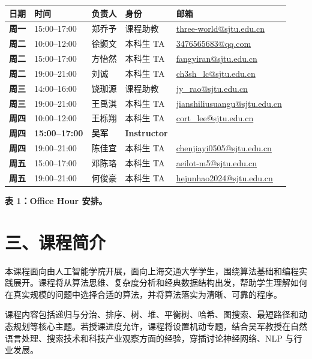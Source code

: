 \documentclass[11pt,a4paper,fontset=none]{ctexart}
\newcommand{\keypoint}[1]{\textbf{\textcolor{emphred}{#1}}}
\newcommand{\captiontext}[1]{\begin{center}{\small \keypoint{#1}}\end{center}}
\begin{document}
\begingroup
\small
\renewcommand{\arraystretch}{1.25}
\setlength{\tabcolsep}{5pt}
\noindent\begin{tabularx}{\textwidth}{@{}>{\bfseries}p{1.0cm}p{2.25cm}p{1.8cm}p{1.8cm}X@{}}
\toprule
\keypoint{日期} & \keypoint{时间} & \keypoint{负责人} & \keypoint{身份} & \keypoint{邮箱} \\
\midrule
周一 & 15:00--17:00 & 郑乔予 & 课程助教 & \href{mailto:three-world@sjtu.edu.cn}{three-world@sjtu.edu.cn} \\
周二 & 10:00--12:00 & 徐颢文 & 本科生 TA & \href{mailto:3476565683@qq.com}{3476565683@qq.com} \\
周二 & 15:00--17:00 & 方怡然 & 本科生 TA & \href{mailto:fangyiran@sjtu.edu.cn}{fangyiran@sjtu.edu.cn} \\
周二 & 19:00--21:00 & 刘诚 & 本科生 TA & \href{mailto:ch3sh_lc@sjtu.edu.cn}{ch3sh\_lc@sjtu.edu.cn} \\
周三 & 14:00--16:00 & 饶珈源 & 课程助教 & \href{mailto:jy_rao@sjtu.edu.cn}{jy\_rao@sjtu.edu.cn} \\
周三 & 19:00--21:00 & 王禹淇 & 本科生 TA & \href{mailto:jianshiliusuangu@sjtu.edu.cn}{jianshiliusuangu@sjtu.edu.cn} \\
周四 & 10:00--12:00 & 王栎翔 & 本科生 TA & \href{mailto:cort_lee@sjtu.edu.cn}{cort\_lee@sjtu.edu.cn} \\
\keypoint{周四} & \keypoint{15:00--17:00} & \keypoint{吴军} & \keypoint{Instructor} & \\
周四 & 19:00--21:00 & 陈佳宜 & 本科生 TA & \href{mailto:chenjiayi0505@sjtu.edu.cn}{chenjiayi0505@sjtu.edu.cn} \\
周五 & 15:00--17:00 & 邓陈珞 & 本科生 TA & \href{mailto:aeilot-m5@sjtu.edu.cn}{aeilot-m5@sjtu.edu.cn} \\
周五 & 19:00--21:00 & 何俊豪 & 本科生 TA & \href{mailto:hejunhao2024@sjtu.edu.cn}{hejunhao2024@sjtu.edu.cn} \\
\bottomrule
\end{tabularx}
\captiontext{表 1：Office Hour 安排。}
\endgroup

\section*{三、课程简介}

本课程面向由人工智能学院开展，面向上海交通大学学生，围绕算法基础和编程实践展开。课程将从算法思维、复杂度分析和经典数据结构出发，帮助学生理解如何在真实规模的问题中选择合适的算法，并将算法落实为清晰、可靠的程序。

课程内容包括递归与分治、排序、树、堆、平衡树、哈希、图搜索、最短路径和动态规划等核心主题。若授课进度允许，课程将设置机动专题，结合吴军教授在自然语言处理、搜索技术和科技产业观察方面的经验，穿插讨论神经网络、NLP 与行业发展。
\end{document}
